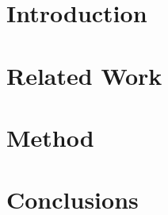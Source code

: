 \documentclass[12pt]{report}
\begin{document}
\maketitle

\begin{abstract}

\end{abstract}

\tableofcontents

\chapter{Introduction}


\chapter{Related Work}


\chapter{Method}


\chapter{Conclusions}


\printbibliography
\end{document}
